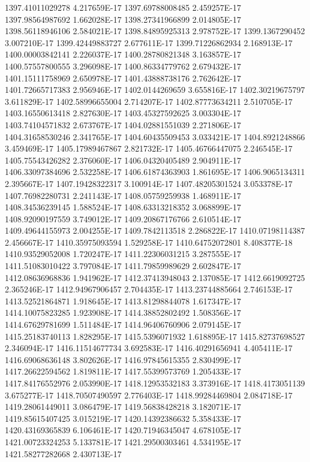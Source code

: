 1397.41011029278  4.217659E-17
1397.69788008485  2.459257E-17
1397.98564987692  1.662028E-17
1398.27341966899  2.014805E-17
1398.56118946106  2.584021E-17
1398.84895925313  2.978752E-17
1399.1367290452  3.007210E-17
1399.42449883727  2.677611E-17
1399.71226862934  2.168913E-17
1400.00003842141  2.226037E-17
1400.28780821348  3.163857E-17
1400.57557800555  3.296098E-17
1400.86334779762  2.679432E-17
1401.15111758969  2.650978E-17
1401.43888738176  2.762642E-17
1401.72665717383  2.956946E-17
1402.0144269659  3.655816E-17
1402.30219675797  3.611829E-17
1402.58996655004  2.714207E-17
1402.87773634211  2.510705E-17
1403.16550613418  2.827630E-17
1403.45327592625  3.003304E-17
1403.74104571832  2.673767E-17
1404.02881551039  2.271806E-17
1404.31658530246  2.341765E-17
1404.60435509453  3.033421E-17
1404.8921248866  3.459469E-17
1405.17989467867  2.821732E-17
1405.46766447075  2.246545E-17
1405.75543426282  2.376060E-17
1406.04320405489  2.904911E-17
1406.33097384696  2.532258E-17
1406.61874363903  1.861695E-17
1406.9065134311  2.395667E-17
1407.19428322317  3.100914E-17
1407.48205301524  3.053378E-17
1407.76982280731  2.241143E-17
1408.05759259938  1.468911E-17
1408.34536239145  1.588524E-17
1408.63313218352  3.068899E-17
1408.92090197559  3.749012E-17
1409.20867176766  2.610514E-17
1409.49644155973  2.004255E-17
1409.7842113518  2.286822E-17
1410.07198114387  2.456667E-17
1410.35975093594  1.529258E-17
1410.64752072801  8.408377E-18
1410.93529052008  1.720247E-17
1411.22306031215  3.287555E-17
1411.51083010422  3.797084E-17
1411.79859989629  2.602847E-17
1412.08636968836  1.941962E-17
1412.37413948043  2.137085E-17
1412.6619092725  2.365246E-17
1412.94967906457  2.704435E-17
1413.23744885664  2.746153E-17
1413.52521864871  1.918645E-17
1413.81298844078  1.617347E-17
1414.10075823285  1.923908E-17
1414.38852802492  1.508356E-17
1414.67629781699  1.511484E-17
1414.96406760906  2.079145E-17
1415.25183740113  1.828295E-17
1415.5396071932  1.618895E-17
1415.82737698527  2.346094E-17
1416.11514677734  3.692583E-17
1416.40291656941  4.405411E-17
1416.69068636148  3.802626E-17
1416.97845615355  2.830499E-17
1417.26622594562  1.819811E-17
1417.55399573769  1.205433E-17
1417.84176552976  2.053990E-17
1418.12953532183  3.373916E-17
1418.4173051139  3.675277E-17
1418.70507490597  2.776403E-17
1418.99284469804  2.084718E-17
1419.28061449011  3.086479E-17
1419.56838428218  3.182071E-17
1419.85615407425  3.015219E-17
1420.14392386632  5.358433E-17
1420.43169365839  6.106461E-17
1420.71946345047  4.678105E-17
1421.00723324253  5.133781E-17
1421.29500303461  4.534195E-17
1421.58277282668  2.430713E-17
